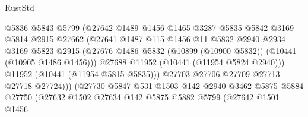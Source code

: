\begin{lexlean}{RustStd}
\begin{coremodule}
                                  @5836
                                  @5843
                                  @5799
                                  (@27642
                                    @1489
                                    @1456
                                    @1465
                                    @3287
                                    @5835
                                    @5842
                                    @3169
                                    @5814
                                    @2915
                                    @27662
                                    (@27641
                                      @1487
                                      @115
                                      @1456
                                      @11
                                      @5832
                                      @2940
                                      @2934
                                      @3169
                                      @5823
                                      @2915
                                      (@27676
                                        @1486
                                        @5832
                                        (@10899 (@10900 @5832))
                                        (@10441 (@10905 @1486 @1456)))
                                      @27688
                                      @11952
                                      (@10441 (@11954 @5824 @2940)))
                                    @11952
                                    (@10441 (@11954 @5815 @5835)))
                                  @27703
                                  @27706
                                  @27709
                                  @27713
                                  @27718
                                  @27724)))
                            (@27730
                              @5847
                              @531
                              @1503
                              @142
                              @2940
                              @3462
                              @5875
                              @5884
                              @27750
                              (@27632
                                @1502
                                @27634
                                @142
                                @5875
                                @5882
                                @5799
                                (@27642
                                  @1501
                                  @1456

\end{coremodule}
\end{lexlean}
